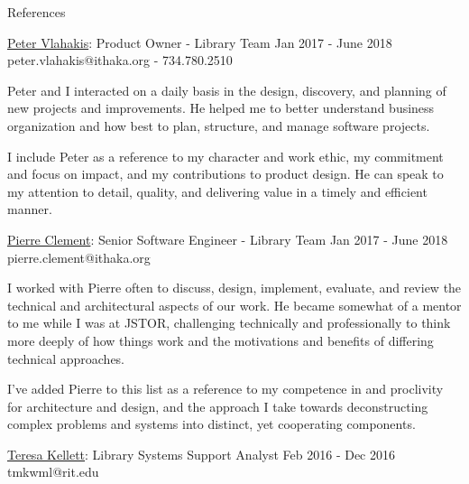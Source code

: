 \documentclass{resume} %
\begin{document}
  \begin{rSection}{References}

    \begin{rSubsection}{\underline{Peter Vlahakis}: Product Owner - Library Team }{ Jan 2017 - June 2018 }{peter.vlahakis@ithaka.org - 734.780.2510}

      \item Peter and I interacted on a daily basis in the design, discovery, and planning of new projects and improvements. He helped me to better understand business organization and how best to plan, structure, and manage software projects. \newline

      \item I include Peter as a reference to my character and work ethic, my commitment and focus on impact, and my contributions to product design. He can speak to my attention to detail, quality, and delivering value in a timely and efficient manner. \newline

    \end{rSubsection}

    \begin{rSubsection}{\underline{Pierre Clement}: Senior Software Engineer - Library Team }{ Jan 2017 - June 2018 }{pierre.clement@ithaka.org}

      \item I worked with Pierre often to discuss, design, implement, evaluate, and review the technical and architectural aspects of our work. He became somewhat of a mentor to me while I was at JSTOR, challenging technically and professionally to think more deeply of how things work and the motivations and benefits of differing technical approaches. \newline

      \item I've added Pierre to this list as a reference to my competence in and proclivity for architecture and design, and the approach I take towards deconstructing complex problems and systems into distinct, yet cooperating components. \newline 

    \end{rSubsection}

    \begin{rSubsection}{\underline{Teresa Kellett}: Library Systems Support Analyst }{ Feb 2016 - Dec 2016 }{tmkwml@rit.edu}


\end{rSubsection}
\end{rSection}
\end{document}
